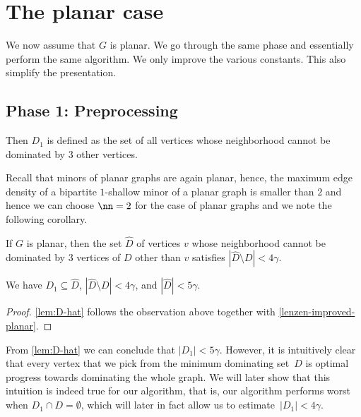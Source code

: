 

\section{The planar case}

We now assume that $G$ is planar. We go through the same phase and essentially
perform the same algorithm. We only improve the various constants. This also
simplify the presentation.

\subsection{Phase 1: Preprocessing}

Then
$D_1$ is defined as the set of all vertices whose
neighborhood cannot be dominated by $3$ other vertices.


Recall that minors of planar graphs are again planar, hence, the
maximum edge density of a bipartite $1$-shallow minor of a planar
graph is smaller than $2$ and hence we can choose $\nn=2$ for the case
of planar graphs and we note the following corollary.
\begin{corollary}\label{lenzen-improved-planar}
  If $G$ is planar, then the set $\hat{D}$ of vertices $v$ whose neighborhood cannot
  be dominated by $3$ vertices of $D$ other than $v$ satisfies
   $|\hat{D}\setminus D| < 4\gamma$.
\end{corollary}




\smallskip
\begin{corollary}\label{lem:D-hat}
  We have $D_1\subseteq \hat D$, $|\hat{D}\setminus D|< 4\gamma$, and
  $|\hat{D}|< 5\gamma$.
\end{corollary}
\begin{proof}
  \cref{lem:D-hat} follows the observation above together with
  \cref{lenzen-improved-planar}.
\end{proof}

From \cref{lem:D-hat} we can conclude that $|D_1|< 5\gamma$. However,
it is intuitively clear that every vertex that we pick from the
minimum dominating set~$D$ is optimal progress towards dominating the
whole graph. We will later show that this intuition is indeed true for
our algorithm, that is, our algorithm performs worst when
$D_1\cap D=\emptyset$, which will later in fact allow us to
estimate~$|D_1|<4\gamma$.

